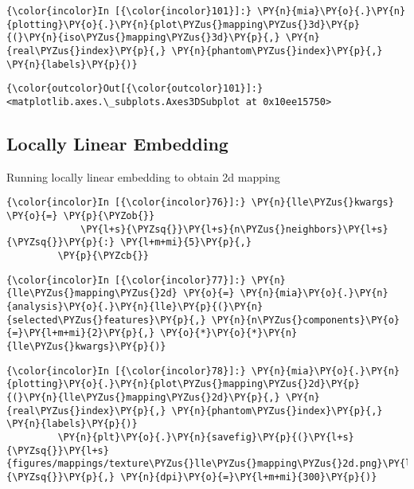     \begin{Verbatim}[commandchars=\\\{\}]
{\color{incolor}In [{\color{incolor}101}]:} \PY{n}{mia}\PY{o}{.}\PY{n}{plotting}\PY{o}{.}\PY{n}{plot\PYZus{}mapping\PYZus{}3d}\PY{p}{(}\PY{n}{iso\PYZus{}mapping\PYZus{}3d}\PY{p}{,} \PY{n}{real\PYZus{}index}\PY{p}{,} \PY{n}{phantom\PYZus{}index}\PY{p}{,} \PY{n}{labels}\PY{p}{)}
\end{Verbatim}

            \begin{Verbatim}[commandchars=\\\{\}]
{\color{outcolor}Out[{\color{outcolor}101}]:} <matplotlib.axes.\_subplots.Axes3DSubplot at 0x10ee15750>
\end{Verbatim}

    \subsection{Locally Linear Embedding}\label{locally-linear-embedding}

Running locally linear embedding to obtain 2d mapping

    \begin{Verbatim}[commandchars=\\\{\}]
{\color{incolor}In [{\color{incolor}76}]:} \PY{n}{lle\PYZus{}kwargs} \PY{o}{=} \PY{p}{\PYZob{}}
             \PY{l+s}{\PYZsq{}}\PY{l+s}{n\PYZus{}neighbors}\PY{l+s}{\PYZsq{}}\PY{p}{:} \PY{l+m+mi}{5}\PY{p}{,}
         \PY{p}{\PYZcb{}}
\end{Verbatim}

    \begin{Verbatim}[commandchars=\\\{\}]
{\color{incolor}In [{\color{incolor}77}]:} \PY{n}{lle\PYZus{}mapping\PYZus{}2d} \PY{o}{=} \PY{n}{mia}\PY{o}{.}\PY{n}{analysis}\PY{o}{.}\PY{n}{lle}\PY{p}{(}\PY{n}{selected\PYZus{}features}\PY{p}{,} \PY{n}{n\PYZus{}components}\PY{o}{=}\PY{l+m+mi}{2}\PY{p}{,} \PY{o}{*}\PY{o}{*}\PY{n}{lle\PYZus{}kwargs}\PY{p}{)}
\end{Verbatim}

    \begin{Verbatim}[commandchars=\\\{\}]
{\color{incolor}In [{\color{incolor}78}]:} \PY{n}{mia}\PY{o}{.}\PY{n}{plotting}\PY{o}{.}\PY{n}{plot\PYZus{}mapping\PYZus{}2d}\PY{p}{(}\PY{n}{lle\PYZus{}mapping\PYZus{}2d}\PY{p}{,} \PY{n}{real\PYZus{}index}\PY{p}{,} \PY{n}{phantom\PYZus{}index}\PY{p}{,} \PY{n}{labels}\PY{p}{)}
         \PY{n}{plt}\PY{o}{.}\PY{n}{savefig}\PY{p}{(}\PY{l+s}{\PYZsq{}}\PY{l+s}{figures/mappings/texture\PYZus{}lle\PYZus{}mapping\PYZus{}2d.png}\PY{l+s}{\PYZsq{}}\PY{p}{,} \PY{n}{dpi}\PY{o}{=}\PY{l+m+mi}{300}\PY{p}{)}
\end{Verbatim}


